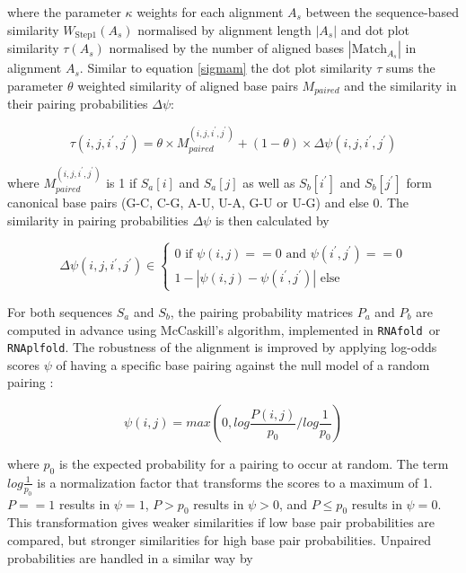 \documentclass{bmcart}
\begin{document}
\noindent where the parameter $\kappa$ weights for each alignment $A_s$ between the
sequence-based similarity $W_{\mbox{Step1}}(A_s)$ normalised by alignment
length $|A_s|$ and dot plot similarity $\tau(A_s)$ normalised by the number of
aligned bases $|\mbox{Match}_{A_s}|$ in alignment $A_s$. Similar to equation
\ref{sigmam} the dot plot similarity $\tau$ sums the parameter $\theta$ weighted
similarity of aligned base pairs $M_{paired}$ and the similarity in their
pairing probabilities $\Delta \psi$:

\begin{equation}\label{eq8}
	\tau(i,j,i^\prime,j^\prime) = \theta \times M_{paired}^{(i,j,i^\prime,j^\prime)}
	+ (1-\theta) \times \Delta \psi(i,j,i^\prime,j^\prime)
\end{equation}

\noindent where $M_{paired}^{(i,j,i^\prime,j^\prime)}$ is 1 if $S_a[i]$ and $S_a[j]$ as
well as $S_b[i^\prime]$ and $S_b[j^\prime]$ form canonical base pairs (G-C, C-G,
A-U, U-A, G-U or U-G) and else 0. The similarity in pairing probabilities
$\Delta \psi$ is then calculated by

\begin{equation}\label{eq9}
	\Delta \psi(i,j,i^\prime,j^\prime) \in \left\{ \begin{array}{l}
			0 \textrm{ if }\psi(i,j) == 0 
			  \textrm{ and }\psi(i^\prime,j^\prime) == 0 \\
		1 - | \psi(i,j) - \psi(i^\prime,j^\prime) | \textrm{ else}
		\end{array}\right.
\end{equation}

\noindent For both sequences $S_a$ and $S_b$, the pairing probability matrices $P_a$ and
$P_b$ are computed in advance using McCaskill's algorithm, implemented in
\texttt{RNAfold }or \texttt{RNAplfold}. The robustness of the alignment is improved by applying
log-odds scores $\psi$ of having a specific base pairing against the null model
of a random pairing \cite{Will17432929}:

\begin{equation}\label{eq11}
	\psi(i,j) = max \left( 0, log \frac{P(i,j)}{p_0} / log \frac{1}{p_0} \right)
\end{equation}

\noindent where $p_0$ is the expected probability for a pairing to occur at random. The
term $log \frac{1}{p_0}$ is a normalization factor that transforms the scores to
a maximum of 1. $P==1$ results in $\psi=1$, $P>p_0$ results in $\psi>0$, and $P\le
p_0$ results in $\psi=0$.  This transformation gives weaker similarities if low
base pair probabilities are compared, but stronger similarities for high base pair
probabilities. Unpaired probabilities are handled in a similar way by
\end{document}
